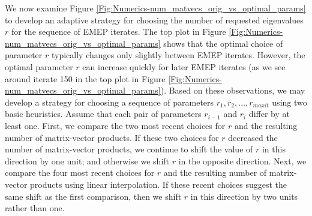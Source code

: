 We now examine Figure \ref{Fig:Numerics-num_matvecs_orig_vs_optimal_params} to develop an adaptive strategy for choosing the number of requested eigenvalues $r$ for the sequence of EMEP iterates.
The top plot in Figure \ref{Fig:Numerics-num_matvecs_orig_vs_optimal_params} shows that the optimal choice of parameter $r$ typically changes only slightly between EMEP iterates.
However, the optimal parameter $r$ can increase quickly for later EMEP iterates (as we see around iterate 150 in the top plot in Figure \ref{Fig:Numerics-num_matvecs_orig_vs_optimal_params}).
Based on these observations, we may develop a strategy for choosing a sequence of parameters $r_1, r_2, \ldots, r_{maxit}$ using two basic heuristics.
Assume that each pair of parameters $r_{i-1}$ and $r_i$ differ by at least one.
First, we compare the two most recent choices for $r$ and the resulting number of matrix-vector products.
If these two choices for $r$ decreased the number of matrix-vector products, we continue to shift the value of $r$ in this direction by one unit; and otherwise we shift $r$ in the opposite direction.
Next, we compare the four most recent choices for $r$ and the resulting number of matrix-vector products using linear interpolation.
If these recent choices suggest the same shift as the first comparison, then we shift $r$ in this direction by two units rather than one.




